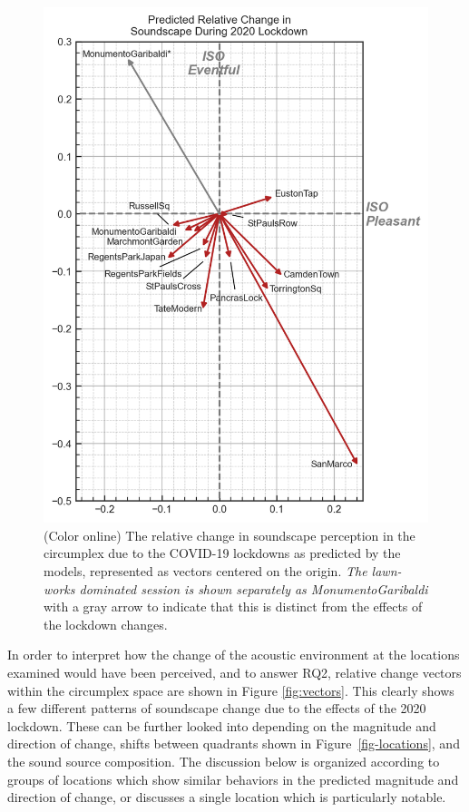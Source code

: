 \documentclass[
  authoryear,
  preprint,
  3p,
  onecolumn]{elsarticle}
\begin{document}
\begin{figure}

{\centering \includegraphics{Figure6.jpg}

}

\caption{\label{fig-vectors}(Color online) The relative change in
soundscape perception in the circumplex due to the COVID-19 lockdowns as
predicted by the models, represented as vectors centered on the origin.
\emph{The lawn-works dominated session is shown separately as
MonumentoGaribaldi} with a gray arrow to indicate that this is distinct
from the effects of the lockdown changes.}

\end{figure}

In order to interpret how the change of the acoustic environment at the
locations examined would have been perceived, and to answer RQ2,
relative change vectors within the circumplex space are shown in Figure
\ref{fig:vectors}. This clearly shows a few different patterns of
soundscape change due to the effects of the 2020 lockdown. These can be
further looked into depending on the magnitude and direction of change,
shifts between quadrants shown in Figure~\ref{fig-locations}, and the
sound source composition. The discussion below is organized according to
groups of locations which show similar behaviors in the predicted
magnitude and direction of change, or discusses a single location which
is particularly notable.
\end{document}
